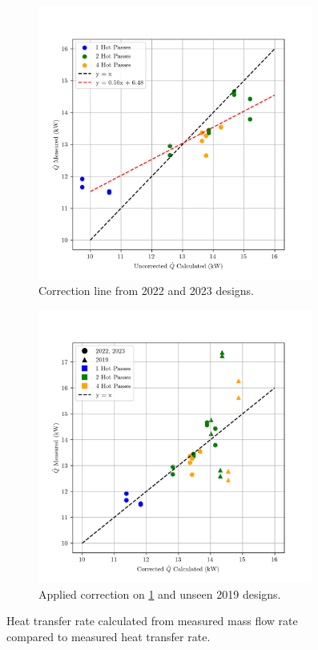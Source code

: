 \documentclass{article}
\begin{document}
\begin{figure}[H]
  \centering
  \begin{subfigure}{.49\textwidth}
    \centering
    \includegraphics[width=0.99\textwidth]{Qdot_ucalc_vs_measured.png}
    \caption{Correction line from 2022 and 2023 designs.}
    \label{fig:uncorrected_Qdot}
  \end{subfigure}
  \begin{subfigure}{.49\textwidth}
    \centering
    \includegraphics[width=0.99\textwidth]{Qdot_ccalc_vs_measured.png}
    \caption{Applied correction on \ref{fig:uncorrected_Qdot} and unseen 2019 designs.}
    \label{fig:corrected_Qdot}
  \end{subfigure}
  \label{fig:Qdot}
  \caption{Heat transfer rate calculated from measured mass flow rate compared to measured heat transfer rate.}
\end{figure}
\end{document}

